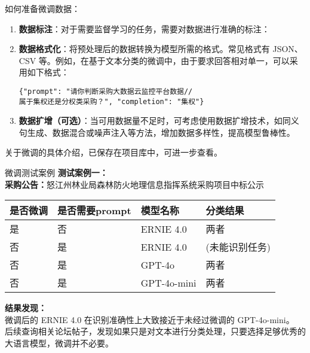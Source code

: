 \documentclass{beamer}
\begin{document}
\begin{frame}[fragile]{如何准备微调数据：}

\begin{enumerate}
    \item \textbf{数据标注}：对于需要监督学习的任务，需要对数据进行准确的标注：
    \item \textbf{数据格式化}：将预处理后的数据转换为模型所需的格式。常见格式有 JSON、CSV 等。例如，在基于文本分类的微调中，由于要求回答相对单一，可以采用如下格式：
    \begin{verbatim}
{"prompt": "请你判断采购大数据云监控平台数据//
属于集权还是分权类采购？", "completion": "集权"}
    \end{verbatim}
    \item \textbf{数据扩增（可选）}：当可用数据量不足时，可考虑使用数据扩增技术，如同义句生成、数据混合或噪声注入等方法，增加数据多样性，提高模型鲁棒性。
\end{enumerate}

关于微调的具体介绍，已保存在项目库中，可进一步查看。
\end{frame}

\begin{frame}[fragile]{微调测试案例}
    \small
    \textbf{测试案例一：}\\[0.5em]
    \textbf{采购公告：}怒江州林业局森林防火地理信息指挥系统采购项目中标公示\\[1em]
    \begin{tabular}{llll}
    \toprule
    是否微调 & 是否需要prompt & 模型名称 & 分类结果 \\
    \midrule
    是 & 否 & ERNIE 4.0   & 两者 \\
    否 & 是 & ERNIE 4.0      & (未能识别任务) \\
    否 & 是 & GPT-4o            & 两者 \\
    否 & 是 & GPT-4o-mini       & 两者 \\
    \bottomrule
    \end{tabular}
  
    \textbf{结果发现：}\\[0.5em]
    微调后的 ERNIE 4.0 在识别准确性上大致接近于未经过微调的 GPT-4o-mini。\\
    后续查询相关论坛帖子，发现如果只是对文本进行分类处理，只要选择足够优秀的大语言模型，微调并不必要。
    \end{frame}
    


\end{document}
